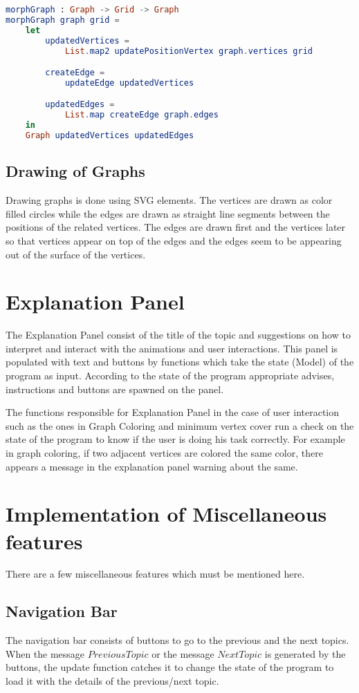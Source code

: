 \begin{lstlisting}[language=elm]
morphGraph : Graph -> Grid -> Graph
morphGraph graph grid =
    let
        updatedVertices =
            List.map2 updatePositionVertex graph.vertices grid

        createEdge =
            updateEdge updatedVertices

        updatedEdges =
            List.map createEdge graph.edges
    in
    Graph updatedVertices updatedEdges
\end{lstlisting}

\subsection{Drawing of Graphs}
Drawing graphs is done using SVG elements. The vertices are drawn as color
filled circles while the edges are drawn as straight line segments between the
positions of the related vertices. The edges are drawn first and the vertices
later so that vertices appear on top of the edges and the edges seem to be
appearing out of the surface of the vertices.

\section{Explanation Panel}
The Explanation Panel consist of the title of the topic and suggestions on how
to interpret and interact with the animations and user interactions. This panel
is populated with text and buttons by functions which take the state (Model) of
the program as input. According to the state of the program appropriate
advises, instructions and buttons are spawned on the panel.

The functions responsible for Explanation Panel in the case of user interaction
such as the ones in Graph Coloring and minimum vertex cover run a check on the
state of the program to know if the user is doing his task correctly. For
example in graph coloring, if two adjacent vertices are colored the same color,
there appears a message in the explanation panel warning about the same.

\section{Implementation of Miscellaneous features}
There are a few miscellaneous features which must be mentioned here.
\subsection{Navigation Bar}
The navigation bar consists of buttons to go to the previous and the next
topics.  When the message $PreviousTopic$ or the message $NextTopic$ is
generated by the buttons, the update function catches it to change the state of
the program to load it with the details of the previous/next topic.
